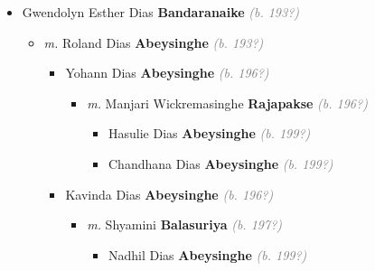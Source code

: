 \documentclass[10pt, openany]{book}
\begin{document}
\begin{itemize}
{\begin{itemize}
{\begin{itemize}
{\begin{itemize}
{\begin{itemize}
\item{\textit{m.} Digby William \textbf{Hall} \textcolor{gray}{\textit{(b. 192?)}}   \label{couple:00001412:00001413} \begin{itemize}
\item{James \textbf{Hall} \textcolor{gray}{\textit{(b. 196?)}}
 }
\item{Mary \textbf{Hall} \textcolor{gray}{\textit{(b. 196?)}}
 }
\item{Emma \textbf{Hall} \textcolor{gray}{\textit{(b. 196?)}}
 }
\item{William \textbf{Hall} \textcolor{gray}{\textit{(b. 197?)}}
 }
\end{itemize}}
\end{itemize}
   }
\item{Gwendolyn Esther Dias \textbf{Bandaranaike} \textcolor{gray}{\textit{(b. 193?)}}
\begin{itemize}
\item{\textit{m.} Roland Dias \textbf{Abeysinghe} \textcolor{gray}{\textit{(b. 193?)}}   \label{couple:00001403:00001404} \begin{itemize}
\item{Yohann Dias \textbf{Abeysinghe} \textcolor{gray}{\textit{(b. 196?)}}
\begin{itemize}
\item{\textit{m.} Manjari Wickremasinghe \textbf{Rajapakse} \textcolor{gray}{\textit{(b. 196?)}}   \label{couple:00001405:00001406} \begin{itemize}
\item{Hasulie Dias \textbf{Abeysinghe} \textcolor{gray}{\textit{(b. 199?)}}
  }
\item{Chandhana Dias \textbf{Abeysinghe} \textcolor{gray}{\textit{(b. 199?)}}
  }
\end{itemize}}
\end{itemize}
  }
\item{Kavinda Dias \textbf{Abeysinghe} \textcolor{gray}{\textit{(b. 196?)}}
\begin{itemize}
\item{\textit{m.} Shyamini \textbf{Balasuriya} \textcolor{gray}{\textit{(b. 197?)}}   \label{couple:00001409:00001410} \begin{itemize}
\item{Nadhil Dias \textbf{Abeysinghe} \textcolor{gray}{\textit{(b. 199?)}}
}
\end{itemize}}
\end{itemize}}
\end{itemize}}
\end{itemize}}
\end{itemize}}
\end{itemize}}
\end{itemize}}
\end{itemize}
\end{document}
